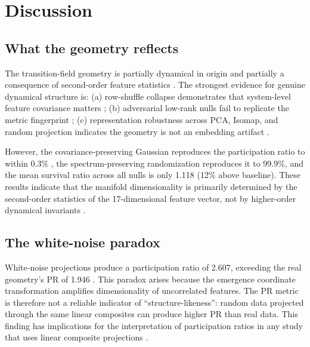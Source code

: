 \documentclass[aip,chaos,showpacs,superscriptaddress,groupedaddress]{revtex4-1}
\begin{document}
\section{Discussion}
\label{sec:discussion}

\subsection{What the geometry reflects}

The transition-field geometry is partially dynamical in origin and partially a consequence of second-order feature statistics \cite{donoho2000intrinsic}. The strongest evidence for genuine dynamical structure is: (a) row-shuffle collapse demonstrates that system-level feature covariance matters \cite{crutchfield1986equivalence}; (b) adversarial low-rank nulls fail to replicate the metric fingerprint \cite{costa2007intrinsic}; (c) representation robustness across PCA, Isomap, and random projection indicates the geometry is not an embedding artifact \cite{meng2019isomap}.

However, the covariance-preserving Gaussian reproduces the participation ratio to within 0.3\% \cite{donoho2000intrinsic}, the spectrum-preserving randomization reproduces it to 99.9\%, and the mean survival ratio across all nulls is only 1.118 (12\% above baseline). These results indicate that the manifold dimensionality is primarily determined by the second-order statistics of the 17-dimensional feature vector, not by higher-order dynamical invariants \cite{amari2016information}.

\subsection{The white-noise paradox}

White-noise projections produce a participation ratio of 2.607, exceeding the real geometry's PR of 1.946 \cite{verleysen2005curse}. This paradox arises because the emergence coordinate transformation amplifies dimensionality of uncorrelated features. The PR metric is therefore not a reliable indicator of ``structure-likeness'': random data projected through the same linear composites can produce higher PR than real data. This finding has implications for the interpretation of participation ratios in any study that uses linear composite projections \cite{roy1989effective, yang2018effective}.
\end{document}
